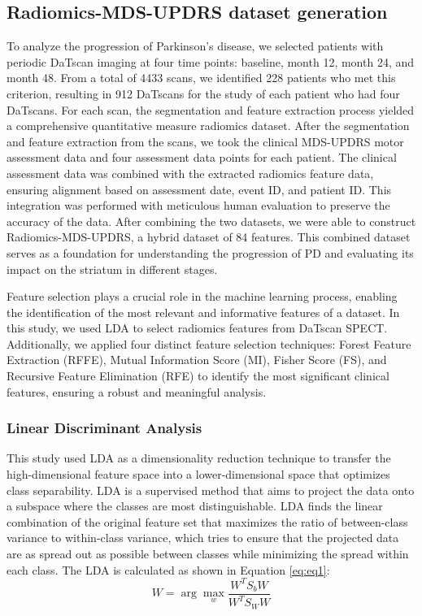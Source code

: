 \documentclass{article}
\begin{document}
\subsection{Radiomics-MDS-UPDRS dataset generation}

To analyze the progression of Parkinson’s disease, we selected patients with periodic DaTscan imaging at four time points: baseline, month 12, month 24, and month 48. From a total of 4433 scans, we identified 228 patients who met this criterion, resulting in 912 DaTscans for the study of each patient who had four DaTscans. For each scan, the segmentation and feature extraction process yielded a comprehensive quantitative measure radiomics dataset. After the segmentation and feature extraction from the scans, we took the clinical MDS-UPDRS motor assessment data and four assessment data points for each patient. The clinical assessment data was combined with the extracted radiomics feature data, ensuring alignment based on assessment date, event ID, and patient ID. This integration was performed with meticulous human evaluation to preserve the accuracy of the data. After combining the two datasets, we were able to construct Radiomics-MDS-UPDRS, a hybrid dataset of 84 features. This combined dataset serves as a foundation for understanding the progression of PD and evaluating its impact on the striatum in different stages.





Feature selection plays a crucial role in the machine learning process, enabling the identification of the most relevant and informative features of a dataset. In this study, we used LDA to select radiomics features from DaTscan SPECT. Additionally, we applied four distinct feature selection techniques: Forest Feature Extraction (RFFE), Mutual Information Score (MI), Fisher Score (FS), and Recursive Feature Elimination (RFE) to identify the most significant clinical features, ensuring a robust and meaningful analysis.


\subsubsection{Linear Discriminant Analysis}

This study used LDA as a dimensionality reduction technique to transfer the high-dimensional feature space into a lower-dimensional space that optimizes class separability. LDA is a supervised method that aims to project the data onto a subspace where the classes are most distinguishable. LDA finds the linear combination of the original feature set that maximizes the ratio of between-class variance to within-class variance, which tries to ensure that the projected data are as spread out as possible between classes while minimizing the spread within each class. The LDA is calculated as shown in Equation \eqref{eq:eq1}:
\begin{equation}
    W = \arg\max_w \frac{W^T S_b W}{W^T S_W W}
    \label{eq:eq1}
\end{equation}
\end{document}
